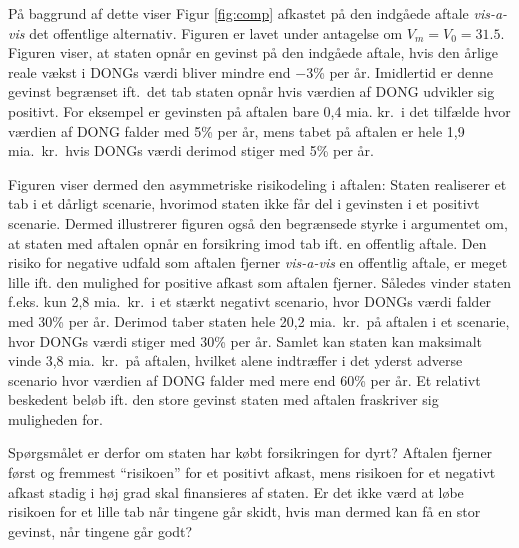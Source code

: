 \documentclass{article}
\begin{document}
På baggrund af dette viser Figur \ref{fig:comp} afkastet på den indgåede aftale \emph{vis-a-vis} det offentlige alternativ. Figuren er lavet under antagelse om  $V_m=V_0=31.5$. Figuren viser, at staten opnår en gevinst på den indgåede aftale, hvis den årlige reale vækst i DONGs værdi bliver mindre end $-3$\% per år. Imidlertid er denne gevinst begrænset ift.\ det tab staten opnår hvis værdien af DONG udvikler sig positivt. For eksempel er gevinsten på aftalen bare 0,4 mia. kr.\ i det tilfælde hvor værdien af DONG falder med 5\% per år, mens tabet på aftalen er hele 1,9 mia.\ kr.\ hvis DONGs værdi derimod stiger med 5\% per år.

Figuren viser dermed den asymmetriske risikodeling i aftalen: Staten realiserer et tab i et dårligt scenarie, hvorimod staten ikke får del i gevinsten i et positivt scenarie. Dermed illustrerer figuren også den begrænsede styrke i argumentet om, at staten med aftalen opnår en forsikring imod tab ift. en offentlig aftale. Den risiko for negative udfald som aftalen fjerner \emph{vis-a-vis} en offentlig aftale, er meget lille ift. den mulighed for positive afkast som aftalen fjerner. Således vinder staten f.eks. kun 2,8 mia.\ kr.\ i et stærkt negativt scenario, hvor DONGs værdi falder med 30\% per år. Derimod taber staten hele 20,2 mia.\ kr.\ på aftalen i et scenarie, hvor DONGs værdi stiger med 30\% per år. Samlet kan staten kan maksimalt vinde 3,8 mia.\ kr.\ på aftalen, hvilket alene indtræffer i det yderst adverse scenario hvor værdien af DONG falder med mere end 60\% per år. Et relativt beskedent beløb ift. den store gevinst staten med aftalen fraskriver sig muligheden for.

Spørgsmålet er derfor om staten har købt forsikringen for dyrt? Aftalen fjerner først og fremmest \enquote{risikoen} for et positivt afkast, mens risikoen for et negativt afkast stadig i høj grad skal finansieres af staten. Er det ikke værd at løbe risikoen for et lille tab når tingene går skidt, hvis man dermed kan få en stor gevinst, når tingene går godt?
\end{document}
